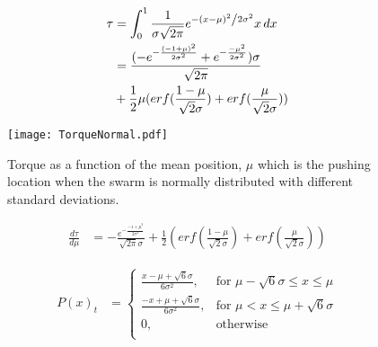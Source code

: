 \begin{align} \nonumber
\tau &= \int_0^1\frac{1}{{\sigma \sqrt {2\pi } }}e^{{{ - \left( {x - \mu } \right)^2 } \mathord{\left/ {\vphantom {{ - \left( {x - \mu } \right)^2 } {2\sigma ^2 }}} \right. \kern-\nulldelimiterspace} {2\sigma ^2 }}} x \, dx\\ \nonumber
&= \frac{(-e^{-\frac{(-1+\mu)^2}{2\sigma^2}}+e^{-\frac{-\mu^2}{2\sigma^2}})\sigma}{\sqrt{2\pi}}\\ 
&+ \frac{1}{2}\mu(erf(\frac{1-\mu}{\sqrt{2}\sigma})+erf(\frac{\mu}{\sqrt{2}\sigma})) 
\end{align}
\begin{figure}
\begin{center}
	\texttt{[image: TorqueNormal.pdf]}
\end{center}
\vspace{-1em}
\caption{\label{fig:torqueNorm}
Torque as a function of the mean position, $\mu$ which is the pushing location when the swarm is normally distributed with different standard deviations.
}
\vspace{-1em}
\end{figure}
\begin{align} 
\frac{d\tau}{d\mu} &= -\frac{e^{-\frac{{-1+\mu}^2}{2\sigma^2}}}{\sqrt{2\pi}\sigma} + \frac{1}{2}(erf(\frac{1-\mu}{\sqrt{2}\sigma})+erf(\frac{\mu}{\sqrt{2}\sigma})) 
\end{align}


\begin{align}
P(x)_{t} &=  \left\{
\begin{array}{ll}
    \frac{x-\mu + \sqrt{6} \sigma}{6\sigma^2}, &  \textrm{for   } \mu-\sqrt{6}\sigma \leq x \leq \mu\\
     \frac{-x+\mu + \sqrt{6} \sigma}{6\sigma^2}, &  \textrm{for   } \mu < x \leq \mu+ \sqrt{6}\sigma\\
     0, & \textrm{otherwise}\\
\end{array} 
\right.
\end{align}

